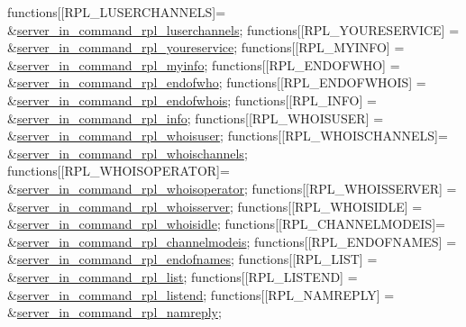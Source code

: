 \begin{DoxyCode}
functions[[RPL\_LUSERCHANNELS]= &\hyperlink{G-2313-06-P2__client__function__handlers_8h_ae53c29cff5b1b8b3981be92c317cf29d}{server\_in\_command\_rpl\_luserchannels};
functions[[RPL\_YOURESERVICE] = &\hyperlink{G-2313-06-P2__client__function__handlers_8h_a9a54a1989e86596904bc4d1c2618ba84}{server\_in\_command\_rpl\_youreservice};
functions[[RPL\_MYINFO]       = &\hyperlink{G-2313-06-P2__client__function__handlers_8h_aa4c4d377b1cde9f0b40997a54c81c3de}{server\_in\_command\_rpl\_myinfo};
functions[[RPL\_ENDOFWHO]     = &\hyperlink{G-2313-06-P2__client__function__handlers_8h_a441993de1d4be974fab21e17aacc553e}{server\_in\_command\_rpl\_endofwho};
functions[[RPL\_ENDOFWHOIS]   = &\hyperlink{G-2313-06-P2__client__function__handlers_8h_a56185c77cfea8620c1ce413a44865bc4}{server\_in\_command\_rpl\_endofwhois};
functions[[RPL\_INFO]         = &\hyperlink{G-2313-06-P2__client__function__handlers_8h_a6477df39f199931be3274e311a18b276}{server\_in\_command\_rpl\_info};
functions[[RPL\_WHOISUSER]    = &\hyperlink{G-2313-06-P2__client__function__handlers_8h_af2190c9ca68abe019cde6f3a18e380c2}{server\_in\_command\_rpl\_whoisuser};
functions[[RPL\_WHOISCHANNELS]= &\hyperlink{G-2313-06-P2__client__function__handlers_8h_a7ed4d1bd7f485fe7c6d26bd1d8eef662}{server\_in\_command\_rpl\_whoischannels};
functions[[RPL\_WHOISOPERATOR]= &\hyperlink{G-2313-06-P2__client__function__handlers_8h_a890fb67530ca5c1f5c14da877fc9ba21}{server\_in\_command\_rpl\_whoisoperator};
functions[[RPL\_WHOISSERVER]  = &\hyperlink{G-2313-06-P2__client__function__handlers_8h_a27bc970f66b7e5a2f3806853c3fa156f}{server\_in\_command\_rpl\_whoisserver};
functions[[RPL\_WHOISIDLE]    = &\hyperlink{G-2313-06-P2__client__function__handlers_8h_ada14de5a081899ca2b5eccbfb9779d62}{server\_in\_command\_rpl\_whoisidle};
functions[[RPL\_CHANNELMODEIS]= &\hyperlink{G-2313-06-P2__client__function__handlers_8h_a23ae57a558e401f83bc03209efb34be2}{server\_in\_command\_rpl\_channelmodeis};
functions[[RPL\_ENDOFNAMES]   = &\hyperlink{G-2313-06-P2__client__function__handlers_8h_a11fdd753a098bb69dc7ca93a89433abb}{server\_in\_command\_rpl\_endofnames};
functions[[RPL\_LIST]         = &\hyperlink{G-2313-06-P2__client__function__handlers_8h_a032cc47903f14a4fbdcec9e54f6a8e4a}{server\_in\_command\_rpl\_list};
functions[[RPL\_LISTEND]      = &\hyperlink{G-2313-06-P2__client__function__handlers_8h_ad4a1e3d492ae6907a5e15e92cb9b69f7}{server\_in\_command\_rpl\_listend};
functions[[RPL\_NAMREPLY]     = &\hyperlink{G-2313-06-P2__client__function__handlers_8h_a770ed57ba6c48c4a349208439e3f19ef}{server\_in\_command\_rpl\_namreply};
\end{DoxyCode}
 ~\newline
